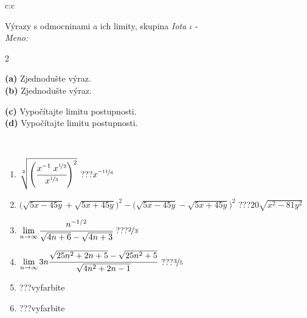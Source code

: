 \documentclass[10pt]{report}
\begin{document}
\begin{tabular}{c:c}
\begin{minipage}[c][104.5mm][t]{0.5\linewidth}
\begin{center}
\vspace{7mm}
{\huge {\Large Výrazy s odmocninami a ich limity}, skupina \textit{Iota $\iota$} -}\\[5mm]
\textit{Meno:}\phantom{xxxxxxxxxxxxxxxxxxxxxxxxxxxxxxxxxxxxxxxxxxxxxxxxxxxxxxxxxxxxxxxxx}\\[5mm]
\begin{minipage}{0.95\linewidth}
\begin{center}
{\small \begin{multicols}{2} \raggedright
\phantom{xxxxxxxxx}\textbf{(a)} Zjednodušte výraz. \\[1mm]
\phantom{xxxxxxxxx}\textbf{(b)} Zjednodušte výraz. \par \columnbreak
\textbf{(c)} Vypočítajte limitu postupnosti. \\[1mm]
\textbf{(d)} Vypočítajte limitu postupnosti.
\end{multicols}
}
\end{center}
\end{minipage}
\\[4mm]
\begin{minipage}{0.79\linewidth}
\begin{center}
\begin{varwidth}{\linewidth}
\begin{enumerate}
\small
\item $\sqrt[2]{\left(\cfrac{x^{-1}\;x^{\nicefrac{1}{2}}}{x^{\nicefrac{1}{3}}}\right)^{2}}$\quad \dotfill\; ???\;\dotfill \quad $x^{\nicefrac{-11}{6}}$
\item {\footnotesize{\scriptsize$\big(\sqrt{5x-45y}+\sqrt{5x+45y}\big)^2-\big(\sqrt{5x-45y}-\sqrt{5x+45y}\big)^2$}\quad \dotfill\; ???\;\dotfill \quad $20\sqrt{x^2-81y^2}$}
\item $\lim\limits_{n\to\infty}\cfrac{n^{-1/2}}{\sqrt{4n+6}-\sqrt{4n+3}}$\quad \dotfill\; ???\;\dotfill \quad $\nicefrac{2}{3}$
\item $\lim\limits_{n\to\infty}3n\cfrac{\sqrt{25n^2+2n+5}-\sqrt{25n^2+5}}{\sqrt{4n^2+2n-1}}$\quad \dotfill\; ???\;\dotfill \quad $\nicefrac{3}{5}$
\item \quad \dotfill\; ???\;\dotfill \quad vyfarbite
\item \quad \dotfill\; ???\;\dotfill \quad vyfarbite
\end{enumerate}
\end{varwidth}

\end{center}
\end{minipage}
\end{center}
\end{minipage}
\end{tabular}
\end{document}
